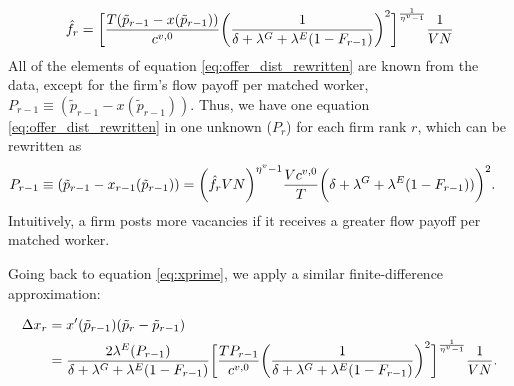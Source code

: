%
\begin{align}
    \hat{f}_{r} = \biggl{[} \frac{T (\tilde{p}_{r - 1} - x(\tilde{p}_{r - 1}))}{c^{v,0}} \biggl{(} \frac{1}{\delta + \lambda^{G} + \lambda^{E} (1 - F_{r - 1})} \biggr{)}^2 \biggr{]}^{\frac{1}{\eta^{v} - 1}} \frac{1}{V N} \label{eq:offer_dist_rewritten}
\end{align}
%
All of the elements of equation \eqref{eq:offer_dist_rewritten} are known from the data, except for the firm's flow payoff per matched worker, $P_{r - 1} \equiv (\tilde{p}_{r - 1} - x(\tilde{p}_{r - 1}))$. Thus, we have one equation \eqref{eq:offer_dist_rewritten} in one unknown ($P_{r}$) for each firm rank $r$, which can be rewritten as
%
\begin{align}
    P_{r - 1} &\equiv (\tilde{p}_{r - 1} - x_{r - 1}(\tilde{p}_{r - 1})) = \biggl{(} \hat{f}_{r} V N \biggr{)}^{\eta^{v} - 1} \frac{V c^{v,0}}{T} \biggl{(} \delta + \lambda^{G} + \lambda^{E} (1 - F_{r - 1})) \biggr{)}^2. \label{eq:flowprofits}
\end{align}
%
Intuitively, a firm posts more vacancies if it receives a greater flow payoff per matched worker.

Going back to equation \eqref{eq:xprime}, we apply a similar finite-difference approximation:
%
\begin{small}
    \begin{align}
        \Delta x_{r} %
        &= x'(\tilde{p}_{r - 1}) (\tilde{p}_{r} - \tilde{p}_{r - 1}) \\
        &= \frac{2 \lambda^{E} (P_{r - 1})}{\delta + \lambda^{G} + \lambda^{E} (1 - F_{r - 1})}  \biggr{[} \frac{T P_{r - 1}}{c^{v,0}} \biggl{(} \frac{1}{\delta + \lambda^{G} + \lambda^{E} (1 - F_{r - 1})} \biggr{)}^2 \biggr{]}^{\frac{1}{\eta^{v}-1}} \frac{1}{V N}. \label{eq:discrete_flow}
    \end{align}
\end{small}
%

